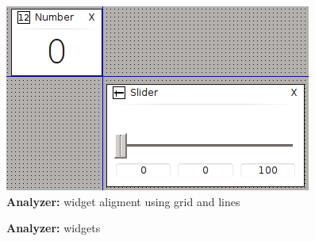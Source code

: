 \documentclass[12pt, a4paper, oneside]{article}
\newcommand{\B}{\textbf} %
\begin{document}
\begin{figure}[H]
\begin{center}
\includegraphics[scale=1]{../img/lines.png}
\caption{\B{Analyzer:} widget aligment using grid and lines}
\label{widget_lines}
\end{center}
\end{figure}

\begin{figure}[H]
\begin{center}
\hfill
{}  
\caption{\B{Analyzer:} widgets}
\label{widgets}
\end{center}
\end{figure}
\end{document}
